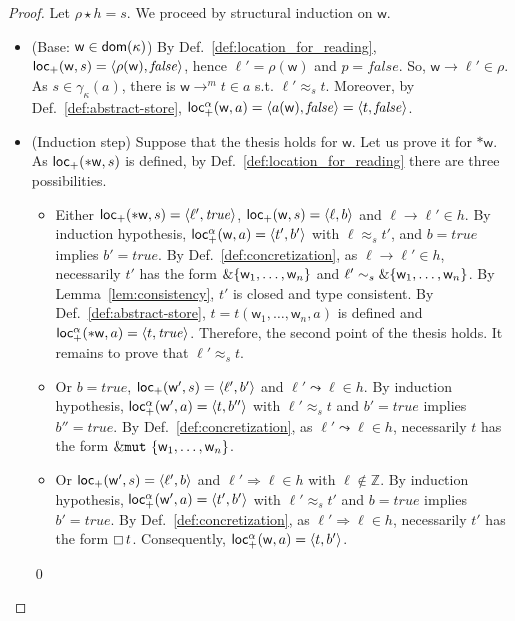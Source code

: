 \begin{proof}
  Let $\rho\star h=s$. We proceed by structural induction on $\mathsf{w}$.
  \begin{itemize}
    \item (Base: $\mathsf{w}\in\mathsf{dom}(\kappa)$)
    By Def.~\ref{def:location_for_reading},
    $\mathsf{loc_+}(\mathsf{w},s) = \langle\rho(\mathsf{w}),\mathit{false}\rangle$,
    hence $\ell'=\rho(\mathsf{w})$ and $p=\mathit{false}$. So,
    $\mathsf{w}\to\ell'\in\rho$. As $s\in\gamma_\kappa(a)$, there is
    $\mathsf{w}\to^m t\in a$ s.t. $\ell'\approx_s t$.
    Moreover, by Def.~\ref{def:abstract-store},
    $\mathsf{loc_+^\alpha}(\mathsf{w},a)=\langle a(\mathsf{w}),\mathit{false}\rangle
    =\langle t,\mathit{false}\rangle$.
  \item (Induction step) Suppose that the thesis holds for $\mathsf{w}$. Let us prove it
    for $\mathtt{*}\mathsf{w}$.
    As $\mathsf{loc_+}(\mathtt{*}\mathsf{w},s)$ is defined,
    by Def.~\ref{def:location_for_reading} there are three possibilities.
    \begin{itemize}
      \item Either $\mathsf{loc_+}(\mathtt{*}\mathsf{w},s)=\langle\ell',\mathit{true}\rangle$,
      $\mathsf{loc_+}(\mathsf{w},s) = \langle \ell,b\rangle$
      and $\ell\to\ell'\in h$. By induction hypothesis,
      $\mathsf{loc_+^\alpha}(\mathsf{w},a)=\langle t',b'\rangle$ with $\ell\approx_s t'$,
      and $b=\mathit{true}$ implies $b'=\mathit{true}$.
      By Def.~\ref{def:concretization}, as $\ell\to\ell'\in h$,
      necessarily $t'$ has the form $\&\{\mathsf{w}_1,\ldots,\mathsf{w}_n\}$
      and $\ell'\sim_s\&\{\mathsf{w}_1,\ldots,\mathsf{w}_n\}$.
      By Lemma~\ref{lem:consistency}, $t'$ is closed and type consistent.
      By Def.~\ref{def:abstract-store},
      $t=t(\mathsf{w}_1,\ldots,\mathsf{w}_n,a)$ is defined and
      $\mathsf{loc_+^\alpha}(\mathtt{*}\mathsf{w},a)=\langle t,\mathit{true}\rangle$.
      Therefore, the second point of the thesis holds.
      It remains to prove that $\ell'\approx_st$.

    \item Or $b=\mathit{true}$,
      $\mathsf{loc_+}(\mathsf{w'},s) = \langle \ell',b'\rangle$
      and $\ell'\leadsto\ell\in h$. By induction hypothesis,
      $\mathsf{loc_+^\alpha}(\mathsf{w'},a)=\langle t,b''\rangle$ with $\ell'\approx_s t$
      and $b'=\mathit{true}$ implies $b''=\mathit{true}$.
      By Def.~\ref{def:concretization}, as $\ell'\leadsto\ell\in h$,
      necessarily $t$ has the form $\&\mathtt{mut}\ \{\mathsf{w}_1,\ldots,\mathsf{w}_n\}$.
      \item Or $\mathsf{loc_+}(\mathsf{w'},s) = \langle \ell',b\rangle$
      and $\ell'\Rightarrow\ell\in h$ with $\ell\not\in\mathbb{Z}$.
      By induction hypothesis,
      $\mathsf{loc_+^\alpha}(\mathsf{w'},a)=\langle t',b'\rangle$ with $\ell'\approx_s t'$
      and $b=\mathit{true}$ implies $b'=\mathit{true}$.
      By Def.~\ref{def:concretization}, as $\ell'\Rightarrow\ell\in h$,
      necessarily $t'$ has the form $\boxempty\,{t}$. Consequently,
      $\mathsf{loc_+^\alpha}(\mathsf{w},a) = \langle t,b'\rangle$.
    \end{itemize}
    \qed
  \end{itemize}
\end{proof}

